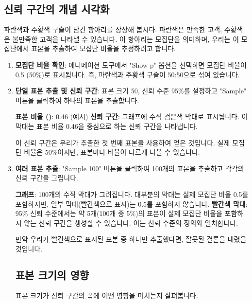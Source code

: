 \documentclass[11pt,a4paper]{article}
\theoremstyle{definition}
\begin{document}
\subsection{신뢰 구간의 개념 시각화}
파란색과 주황색 구슬이 담긴 항아리를 상상해 봅시다. 파란색은 만족한 고객, 주황색은 불만족한 고객을 나타낼 수 있습니다. 이 항아리는 모집단을 의미하며, 우리는 이 모집단에서 표본을 추출하여 모집단 비율을 추정하려고 합니다.

\begin{enumerate}
    \item \textbf{모집단 비율 확인}:
    애니메이션 도구에서 "Show p" 옵션을 선택하면 모집단 비율이 0.5 (50\%)로 표시됩니다. 즉, 파란색과 주황색 구슬이 50:50으로 섞여 있습니다.

    \item \textbf{단일 표본 추출 및 신뢰 구간}:
    표본 크기 50, 신뢰 수준 95\%를 설정하고 "Sample" 버튼을 클릭하여 하나의 표본을 추출합니다.
    \begin{examplebox}[title=단일 표본 결과]
        \textbf{표본 비율 ()}: 0.46 (예시)
        \textbf{신뢰 구간}: 그래프에 수직 검은색 막대로 표시됩니다. 이 막대는 표본 비율 0.46을 중심으로 하는 신뢰 구간을 나타냅니다.
    \end{examplebox}
    이 신뢰 구간은 우리가 추출한 첫 번째 표본을 사용하여 얻은 것입니다. 실제 모집단 비율은 50\%이지만, 표본마다 비율이 다르게 나올 수 있습니다.

    \item \textbf{여러 표본 추출}:
    "Sample 100" 버튼을 클릭하여 100개의 표본을 추출하고 각각의 신뢰 구간을 그립니다.
    \begin{examplebox}[title=100개 표본 결과]
        \textbf{그래프}: 100개의 수직 막대가 그려집니다. 대부분의 막대는 실제 모집단 비율 0.5를 포함하지만, 일부 막대(빨간색으로 표시)는 0.5를 포함하지 않습니다.
        \textbf{빨간색 막대}: 95\% 신뢰 수준에서는 약 5개(100개 중 5\%)의 표본이 실제 모집단 비율을 포함하지 않는 신뢰 구간을 생성할 수 있습니다. 이는 신뢰 수준의 정의와 일치합니다.
    \end{examplebox}
    만약 우리가 빨간색으로 표시된 표본 중 하나만 추출했다면, 잘못된 결론을 내렸을 것입니다.

\subsection{표본 크기의 영향}
표본 크기가 신뢰 구간의 폭에 어떤 영향을 미치는지 살펴봅니다.


\end{enumerate}
\end{document}
